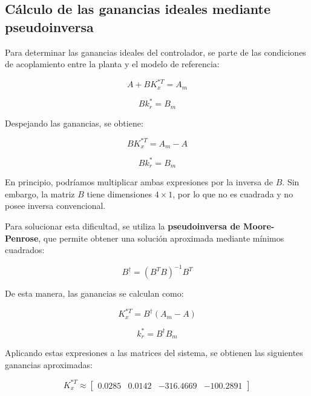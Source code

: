 \documentclass[conference,letterpaper]{IEEEtran}
\begin{document}
\subsection{Cálculo de las ganancias ideales mediante pseudoinversa}

Para determinar las ganancias ideales del controlador, se parte
de las condiciones de acoplamiento entre la planta y el
modelo de referencia:

\begin{equation}
    A+BK_x^{*T}=A_m
\end{equation}

\begin{equation}
    Bk_r^*=B_m
\end{equation}

Despejando las ganancias, se obtiene:

\begin{equation}
    BK_x^{*T}=A_m-A
\end{equation}

\begin{equation}
    Bk_r^*=B_m
\end{equation}

En principio, podríamos multiplicar ambas expresiones por
la inversa de $B$. Sin embargo, la matriz $B$ tiene
dimensiones $4\times1$, por lo que no es cuadrada y no
posee inversa convencional.

Para solucionar esta dificultad, se utiliza la
\textbf{pseudoinversa de Moore-Penrose}, que permite
obtener una solución aproximada mediante mínimos cuadrados:

\begin{equation}
    B^\dagger=(B^TB)^{-1}B^T
\end{equation}

De esta manera, las ganancias se calculan como:

\begin{equation}
    \boxed{K_x^{*T}=B^\dagger(A_m-A)}
\end{equation}

\begin{equation}
    \boxed{k_r^*=B^\dagger B_m}
\end{equation}

Aplicando estas expresiones a las matrices del sistema,
se obtienen las siguientes ganancias aproximadas:

\begin{equation}
    \boxed{
    K_x^{*T}\approx
    \begin{bmatrix}
    0.0285 & 0.0142 & -316.4669 & -100.2891
    \end{bmatrix}
    }
\end{equation}
\end{document}
